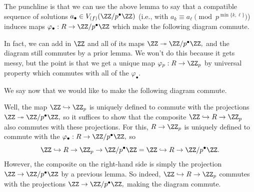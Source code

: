 The punchline is that we can use the above lemma to say that a compatible sequence of solutions $a_\bullet\in V_{(f)}(\ZZ/p^\bullet\ZZ)$ (i.e., with $a_k\equiv a_\ell\pmod{p^{\min\{k,\ell\}}}$) induces maps $\varphi_\bullet:R\to\ZZ/p^\bullet\ZZ$ which make the following diagram commute.
\begin{center}
\end{center}
In fact, we can add in $\ZZ$ and all of its maps $\ZZ\twoheadrightarrow\ZZ/p^\bullet\ZZ,$ and the diagram still commutes by a prior lemma. We won't do this because it gets messy, but the point is that we get a unique map $\varphi_p:R\to\ZZ_p$ by universal property which commutes with all of the $\varphi_\bullet.$

We say now that we would like to make the following diagram commute.
\begin{center}
\end{center}
Well, the map $\ZZ\hookrightarrow\ZZ_p$ is uniquely defined to commute with the projections $\ZZ\twoheadrightarrow\ZZ/p^\bullet\ZZ,$ so it suffices to show that the composite $\ZZ\hookrightarrow R\to\ZZ_p$ also commutes with these projections. For this, $R\to\ZZ_p$ is uniquely defined to commute with the $\varphi_\bullet:R\to\ZZ/p^\bullet\ZZ,$ so
\[\ZZ\hookrightarrow R\to\ZZ_p\to\ZZ/p^\bullet\ZZ=\ZZ\hookrightarrow R\to\ZZ/p^\bullet\ZZ.\]
However, the composite on the right-hand side is simply the projection $\ZZ\to\ZZ/p^\bullet\ZZ$ by a previous lemma. So indeed, $\ZZ\hookrightarrow R\to\ZZ_p$ commutes with the projections $\ZZ\to\ZZ/p^\bullet\ZZ,$ making the diagram commute.

